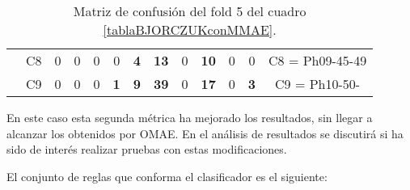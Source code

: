 \begin{table}[H]
{\begin{tabular}{|ccrrrrrrrrrrc|}
\multicolumn{1}{|c|}{}                                      & \multicolumn{1}{c|}{C8} & \multicolumn{1}{c|}{0}  & \multicolumn{1}{c|}{0}          & \multicolumn{1}{c|}{0}          & \multicolumn{1}{c|}{0}          & \multicolumn{1}{c|}{\textbf{4}} & \multicolumn{1}{c|}{\textbf{13}} & \multicolumn{1}{c|}{0}          & \multicolumn{1}{c|}{\textbf{10}} & \multicolumn{1}{c|}{0}          & \multicolumn{1}{c|}{0}          & C8 = Ph09-45-49   \\ \cline{2-13}
\multicolumn{1}{|c|}{}                                      & \multicolumn{1}{c|}{C9} & \multicolumn{1}{c|}{0}  & \multicolumn{1}{c|}{0}          & \multicolumn{1}{c|}{0}          & \multicolumn{1}{c|}{\textbf{1}} & \multicolumn{1}{c|}{\textbf{9}} & \multicolumn{1}{c|}{\textbf{39}} & \multicolumn{1}{c|}{0}          & \multicolumn{1}{c|}{\textbf{17}} & \multicolumn{1}{c|}{0}          & \multicolumn{1}{c|}{\textbf{3}} & C9 = Ph10-50-     \\ \hline
\end{tabular}%
}
\caption{Matriz de confusión del fold 5 del cuadro \ref{tablaBJORCZUKconMMAE}.}
\end{table}

En este caso esta segunda métrica ha mejorado los resultados, sin llegar a alcanzar los obtenidos por OMAE. En el análisis de resultados se discutirá si ha sido de interés realizar pruebas con estas modificaciones.

El conjunto de reglas que conforma el clasificador es el siguiente:

